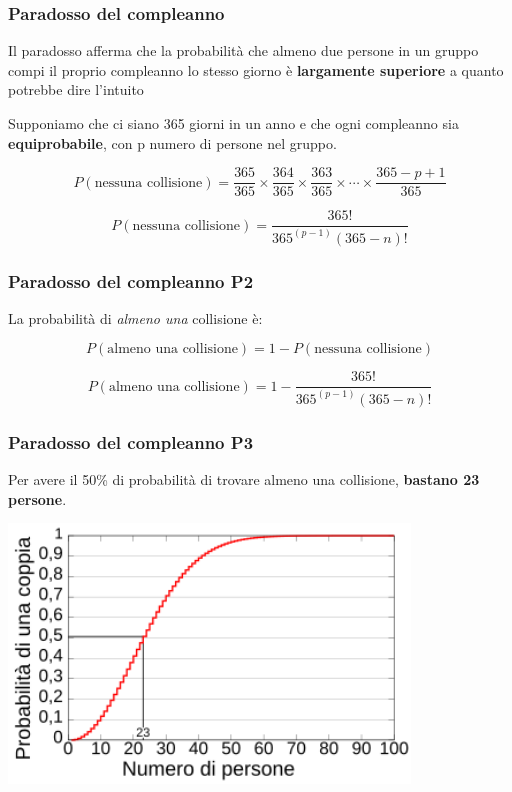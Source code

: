 \begin{frame}
	\frametitle{Paradosso del compleanno}

	Il paradosso afferma che la probabilità che almeno due persone in un gruppo compi il proprio compleanno lo stesso giorno è \textbf{largamente superiore} a quanto potrebbe dire l'intuito

	Supponiamo che ci siano 365 giorni in un anno e che ogni compleanno sia \textbf{equiprobabile}, con p numero di persone nel gruppo.

	\[
		P(\text{nessuna collisione}) = \frac{365}{365} \times \frac{364}{365} \times \frac{363}{365} \times \cdots \times \frac{365 - p + 1}{365}
	\]

	\[
		P(\text{nessuna collisione}) = \frac{365!}{365^(p-1) (365 - n)!}
	\]

\end{frame}

\begin{frame}
	\frametitle{Paradosso del compleanno P2}

	La probabilità di \textit{almeno una} collisione è:

	\[
		P(\text{almeno una collisione}) = 1 - P(\text{nessuna collisione})
	\]

	\[
		P(\text{almeno una collisione}) = 1 - \frac{365!}{365^(p-1) (365 - n)!}
	\]

\end{frame}


\begin{frame}
	\frametitle{Paradosso del compleanno P3}

	Per avere il 50\% di probabilità di trovare almeno una collisione, \textbf{bastano 23 persone}.

	\begin{center}
		\includegraphics[width=0.8\textwidth]{img/2-img/Birthday_Paradox_IT.png}
	\end{center}

\end{frame}

